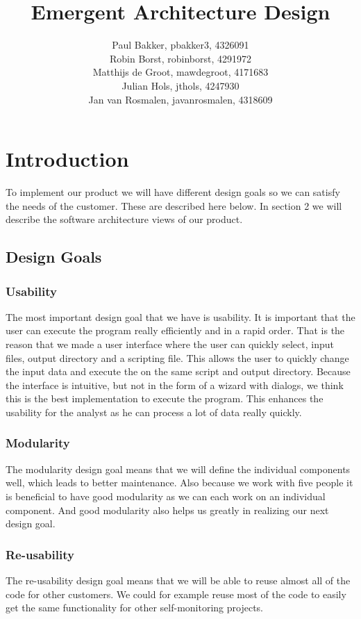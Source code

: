 \documentclass[11pt,twoside,a4paper]{article}
\title{Emergent Architecture Design}
\author{
	Paul Bakker, pbakker3, 4326091 \\
    Robin Borst, robinborst, 4291972 \\
    Matthijs de Groot, mawdegroot, 4171683 \\
    Julian Hols, jthols, 4247930\\
    Jan van Rosmalen, javanrosmalen, 4318609\\
}
\begin{document}
\maketitle
\newpage
\tableofcontents
\newpage

\section{Introduction}

To implement our product we will have different design goals so we can satisfy the needs of the customer. These are described here below. In section 2 we will describe the software architecture views of our product.

\subsection{Design Goals}
\subsubsection{Usability}
The most important design goal that we have is usability. It is important that the user can execute the program really efficiently and in a rapid order. That is the reason that we made a user interface where the user can quickly select, input files, output directory and a scripting file. This allows the user to quickly change the input data and execute the on the same script and output directory.  Because the interface is intuitive, but not in the form of a wizard with dialogs, we think this is the best implementation to execute the program. This enhances the usability for the analyst as he can process a lot of data really quickly.
\subsubsection{Modularity}
The modularity design goal means that we will define the individual components well, which leads to better maintenance. Also because we work with five people it is beneficial to have good modularity as we can each work on an individual component. And good modularity also helps us greatly in realizing our next design goal.
\subsubsection{Re-usability}
The re-usability design goal means that we will be able to reuse almost all of the code for other customers. We could for example reuse most of the code to easily get the same functionality for other self-monitoring projects.
\end{document}
